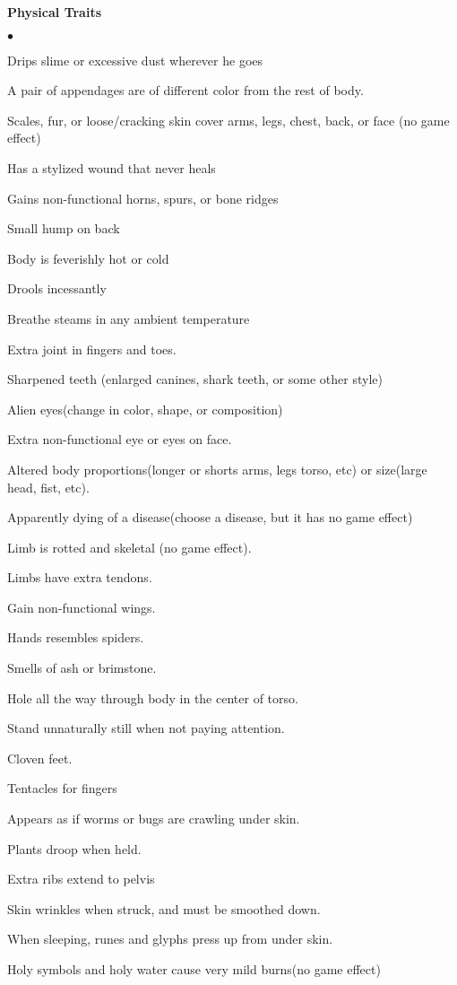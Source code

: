 
\textbf{Physical Traits}
\begin{small}
\begin{list}{$\bullet$}{\itemspace}
\item Drips slime or excessive dust wherever he goes
\item A pair of appendages are of different color from the rest of body.
\item Scales, fur, or loose/cracking skin cover arms, legs, chest, back, or face (no game effect)
\item Has a stylized wound that never heals
\item Gains non-functional horns, spurs, or bone ridges
\item Small hump on back
\item Body is feverishly hot or cold
\item Drools incessantly
\item Breathe steams in any ambient temperature
\item Extra joint in fingers and toes.
\item Sharpened teeth (enlarged canines, shark teeth, or some other style)
\item Alien eyes(change in color, shape, or composition)
\item Extra non-functional eye or eyes on face.
\item Altered body proportions(longer or shorts arms, legs torso, etc) or size(large head, fist, etc).
\item Apparently dying of a disease(choose a disease, but it has no game effect)
\item Limb is rotted and skeletal (no game effect).
\item Limbs have extra tendons.
\item Gain non-functional wings.
\item Hands resembles spiders.
\item Smells of ash or brimstone.
\item Hole all the way through body in the center of torso.
\item Stand unnaturally still when not paying attention.
\item Cloven feet.
\item Tentacles for fingers
\item Appears as if worms or bugs are crawling under skin.
\item Plants droop when held.
\item Extra ribs extend to pelvis
\item Skin wrinkles when struck, and must be smoothed down.
\item When sleeping, runes and glyphs press up from under skin.
\item Holy symbols and holy water cause very mild burns(no game effect)
\end{list}
\end{small}

